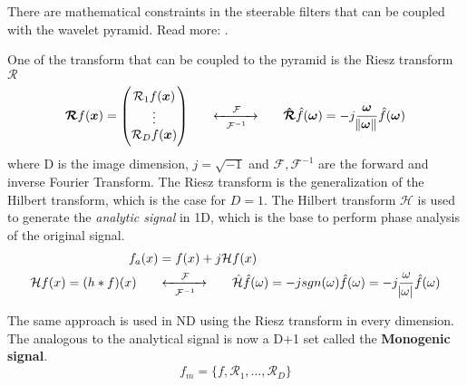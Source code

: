 \documentclass{InsightArticle}
\theoremstyle{definition}
\begin{document}
There are mathematical constraints in the steerable filters that can be coupled with the wavelet pyramid. Read more: \cite{unser_multiresolution_2009, unser_steerable_2011}.

One of the transform that can be coupled to the pyramid is the Riesz transform $\bm{\mathcal{R}}$
\begin{equation}
\bm{\mathcal{R}} f(\bm{x}) =
  \begin{pmatrix}
    \mathcal{R}_{1} f(\bm{x}) \\
    \vdots \\
    \mathcal{R}_D f(\bm{x})
  \end{pmatrix}
  \hspace{0.6cm}
  \xleftrightarrow[\mathcal{F}^{-1}]{\hspace{0.4cm}\mathcal{F}\hspace{0.4cm}}
  \hspace{0.6cm}
  \bm{\hat{\mathcal{R}}}\hat{f}(\bm{\omega}) = -j \frac{\bm{\omega}}{\norm{\bm{\omega}}}\hat{f}(\bm{\omega})
\end{equation}
where D is the image dimension, $j=\sqrt{-1}$ and $\mathcal{F}, \mathcal{F}^{-1}$ are the forward and inverse Fourier Transform.
The Riesz transform is the generalization of the Hilbert transform, which is the case for $D=1$. The Hilbert transform $\mathcal{H}$ is used to generate the \textit{analytic signal} in 1D, which is the base to perform phase analysis of the original signal.
\begin{equation}
\label{eq:analytic-signal}
\begin{aligned}
  f_a(x) &= f(x) + j \mathcal{H}f(x) \\
  \mathcal{H}f(x) = (h * f)(x)
  \hspace{0.6cm}
  &\xleftrightarrow[\mathcal{F}^{-1}]{\hspace{0.4cm}\mathcal{F}\hspace{0.4cm}}
  \hspace{0.6cm}
  \hat{\mathcal{H}}\hat{f}(\omega) = -jsgn(\omega)\hat{f}(\omega) = -j \frac{\omega}{\abs{\omega}}\hat{f}(\omega)
\end{aligned}
\end{equation}

The same approach is used in ND using the Riesz transform in every dimension.
The analogous to the analytical signal is now a D+1 set called the \textbf{Monogenic signal}\cite{felsberg_monogenic_2001, kovesi_peters_????}.
\begin{equation}
  f_m = \{f, \mathcal{R}_1, ..., \mathcal{R}_D\}
\end{equation}
\end{document}
